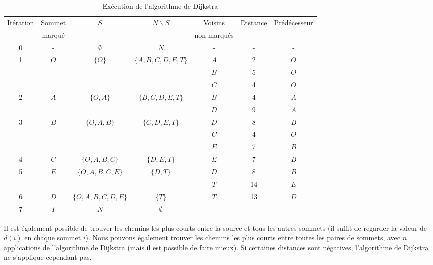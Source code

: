\begin{example}
\begin{table}[htbp]
\begin{center}
\begin{tabular}{|c|c|c|c|c|c|c|}
\hline
Itération & Sommet & $S$ & $N\backslash S$ & Voisins & Distance & Prédécesseur \\
& marqué & & & non marqués & & \\
\hline
0 & - & $\emptyset$ & $N$ & - & - & - \\
\hline
1 & $O$ & $\lbrace O \rbrace$ & $\lbrace A, B, C, D, E, T \rbrace$ &
$A$ & 2 & $O$ \\
& & & & $B$ & 5 & $O$ \\
& & & & $C$ & 4 & $O$ \\
\hline
2 & $A$ & $\lbrace O, A \rbrace$ & $\lbrace B, C, D, E, T \rbrace$ &
$B$ & 4 & $A$ \\
& & & & $D$ & 9 & $A$ \\
\hline
3 & $B$ & $\lbrace O, A, B \rbrace$ & $\lbrace C, D, E, T \rbrace$ &
$D$ & 8 & $B$ \\
& & & & $C$ & 4 & $O$ \\
& & & & $E$ & 7 & $B$ \\
\hline
4 & $C$ & $\lbrace O, A, B, C \rbrace$ & $\lbrace D, E, T \rbrace$ &
$E$ & 7 & $B$ \\
\hline
5 & $E$ & $\lbrace O, A, B, C, E \rbrace$ & $\lbrace D, T \rbrace$ &
$D$ & 8 & $B$ \\
& & & & $T$ & 14 & $E$ \\
\hline
6 & $D$ & $\lbrace O, A, B, C, D, E \rbrace$ & $\lbrace T \rbrace$ &
$T$ & 13 & $D$ \\
\hline
7 & $T$ & $N$ & $\emptyset$ & - & - & - \\
\hline
\end{tabular}
\caption{Exécution de l'algorithme de Dijkstra}
\label{tab:dijkstra}
\end{center}
 
\end{table}

\end{example}

Il est également possible de trouver les chemins les plus courts entre la source
et tous les autres sommets (il suffit de regarder la valeur de $d(i)$ en chaque sommet $i$).
Nous pouvons également trouver les chemins les plus courts entre toutes les paires de sommets, avec $n$ applications de l'algorithme de Dijkstra (mais il est possible de faire mieux).
Si certaines distances sont négatives, l'algorithme de Dijkstra ne s'applique cependant pas.


